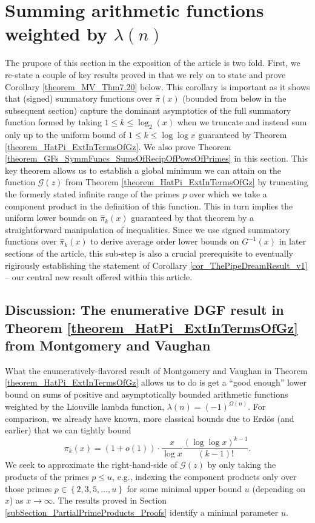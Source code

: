\documentclass[11pt,reqno,a4letter]{article}
\numberwithin{figure}{section}
\numberwithin{table}{section}
\theoremstyle{plain}
\numberwithin{theorem}{section}
\theoremstyle{definition}
\begin{document}
\newpage 
\section{Summing arithmetic functions weighted by $\lambda(n)$} 
\label{Section_MVCh7_GzBounds} 

The prupose of this section in the exposition of the article is two fold. 
First, we re-state a couple of key results proved in \cite[\S 7.4]{MV} that we rely on 
to state and prove Corollary \ref{theorem_MV_Thm7.20} below. This corollary is important as it shows 
that (signed) summatory functions over $\widehat{\pi}(x)$ (bounded from below in the subsequent section) 
capture the dominant asymptotics of the full summatory function formed by taking $1 \leq k \leq \log_2(x)$ when 
we truncate and instead sum only up to the uniform bound of $1 \leq k \leq \log\log x$ guaranteed by 
Theorem \ref{theorem_HatPi_ExtInTermsOfGz}. We also prove 
Theorem \ref{theorem_GFs_SymmFuncs_SumsOfRecipOfPowsOfPrimes} in this section. 
This key theorem allows us to establish a global minimum we can attain on the function $\mathcal{G}(z)$ from 
Theorem \ref{theorem_HatPi_ExtInTermsOfGz} by truncating the formerly stated infinite 
range of the primes $p$ over which we take a component product in the definition of this function. 
This in turn implies the uniform lower bounds on $\widehat{\pi}_k(x)$ guaranteed by that theorem by 
a straightforward manipulation of inequalities. Since we use signed summatory functions over 
$\widehat{\pi}_k(x)$ to derive average order lower bounds on $G^{-1}(x)$ in later sections of the article, 
this sub-step is also a crucial prerequisite to eventually rigirously establishing the statement of 
Corollary \ref{cor_ThePipeDreamResult_v1} -- 
our central new result offered within this article. 

\subsection{Discussion: The enumerative DGF result in Theorem \ref{theorem_HatPi_ExtInTermsOfGz} from 
            Montgomery and Vaughan} 
\label{subSection_MVPrereqResultStmts} 

What the enumeratively-flavored result of Montgomery and Vaughan 
in Theorem \ref{theorem_HatPi_ExtInTermsOfGz} allows us to do is get a 
``good enough'' lower bound on sums of positive and asymptotically bounded arithmetic functions 
weighted by the Liouville lambda function, $\lambda(n) = (-1)^{\Omega(n)}$. 
For comparison, we already have known, more classical bounds due to Erd\"os (and earlier) that 
we can tightly bound \cite{ERDOS-PRIMEK-FUNC,MV} 
\[
\pi_k(x) = (1 + o(1)) \cdot \frac{x}{\log x} \frac{(\log\log x)^{k-1}}{(k-1)!}. 
\] 
We seek to approximate the right-hand-side of $\mathcal{G}(z)$ by only taking the products of the primes 
$p \leq u$, e.g., indexing the component products only over those primes 
$p \in \left\{2,3,5,\ldots,u\right\}$ for some minimal upper bound $u$ (depending on $x$) 
as $x \rightarrow \infty$. 
The results proved in Section \ref{subSection_PartialPrimeProducts_Proofs} identify a minimal parameter $u$. 
\end{document}
